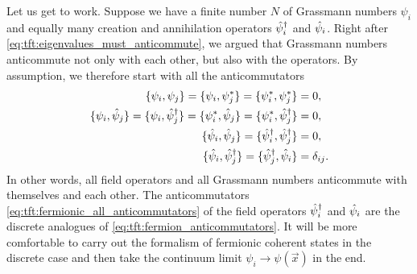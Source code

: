 Let us get to work.
Suppose we have a finite number $N$ of Grassmann numbers $\psi_i$ and equally many creation and annihilation operators $\hat\psi^\dagger_i$ and $\hat\psi_i$.
Right after \cref{eq:tft:eigenvalues_must_anticommute}, we argued that Grassmann numbers anticommute not only with each other, but also with the operators.
By assumption, we therefore start with all the anticommutators
\begin{equation}
\begin{split}
	\{ \psi_i , \psi_j \} = \{ \psi_i , {\psi}^*_j \} = \{ {\psi}^*_i , {\psi}^*_j \}                             &= 0            , \\
	\{ \psi_i , \hat\psi_j \} = \{ \psi_i , \hat\psi^\dagger_j \} = \{ {\psi}^*_i , \hat\psi_j \} = \{ {\psi}^*_i , \hat\psi^\dagger_j \} &= 0            , \\
	\{ \hat\psi_i , \hat\psi_j \} = \{ \hat\psi^\dagger_i , \hat\psi^\dagger_j \}                                                             &= 0            , \\
	\{ \hat\psi_i , \hat\psi^\dagger_j \} = \{ \hat\psi^\dagger_j , \hat\psi_i \}                                                             &= \delta_{i j} . \\
\end{split}
\label{eq:tft:fermionic_all_anticommutators}
\end{equation}
In other words, all field operators and all Grassmann numbers anticommute with themselves and each other.
The anticommutators \eqref{eq:tft:fermionic_all_anticommutators} of the field operators $\hat\psi^\dagger_i$ and $\hat\psi_i$ are the discrete analogues of \eqref{eq:tft:fermion_anticommutators}.
It will be more comfortable to carry out the formalism of fermionic coherent states in the discrete case and then take the continuum limit $\psi_i \rightarrow \psi(\vec{x})$ in the end.

